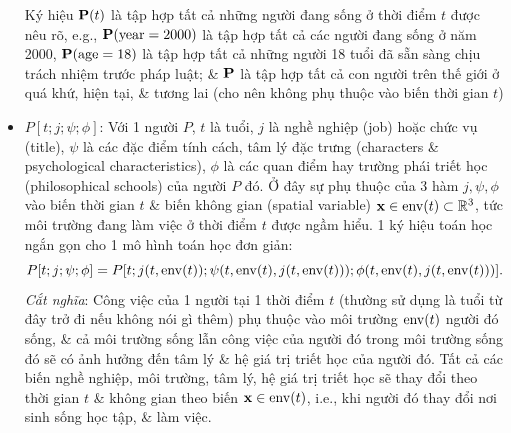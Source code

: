 \documentclass[12pt,twoside]{book}
\begin{document}
\begin{itemize}
	Ký hiệu ${\bf P}(t)$ là tập hợp tất cả những người đang sống ở thời điểm $t$ được nêu rõ, e.g., ${\bf P}({\rm year} = 2000)$ là tập hợp tất cả các người đang sống ở năm 2000, ${\bf P}({\rm age} = 18)$ là tập hợp tất cả những người 18 tuổi đã sẵn sàng chịu trách nhiệm trước pháp luật; \& ${\bf P}$ là tập hợp tất cả con người trên thế giới ở quá khứ, hiện tại, \& tương lai (cho nên không phụ thuộc vào biến thời gian $t$)
	\item $P[t;j;\psi;\phi]$: Với 1 người $P$, $t$ là tuổi, $j$ là nghề nghiệp (job) hoặc chức vụ (title), $\psi$ là các đặc điểm tính cách, tâm lý đặc trưng (characters \& psychological characteristics), $\phi$ là các quan điểm hay trường phái triết học (philosophical schools) của người $P$ đó. Ở đây sự phụ thuộc của 3 hàm $j,\psi,\phi$ vào biến thời gian $t$ \& biến không gian (spatial variable) ${\bf x}\in{\rm env}(t)\subset\mathbb{R}^3$, tức môi trường đang làm việc ở thời điểm $t$ được ngầm hiểu. 1 ký hiệu toán học ngắn gọn cho 1 mô hình toán học đơn giản:
	\begin{equation}
		P[t;j;\psi;\phi] = P[t;j(t,{\rm env}(t));\psi(t,{\rm env}(t),j(t,{\rm env}(t)));\phi(t,{\rm env}(t),j(t,{\rm env}(t)))].
	\end{equation}
	{\it Cắt nghĩa}: Công việc của 1 người tại 1 thời điểm $t$ (thường sử dụng là tuổi từ đây trở đi nếu không nói gì thêm) phụ thuộc vào môi trường ${\rm env}(t)$ người đó sống, \& cả môi trường sống lẫn công việc của người đó trong môi trường sống đó sẽ có ảnh hưởng đến tâm lý \& hệ giá trị triết học của người đó. Tất cả các biến nghề nghiệp, môi trường, tâm lý, hệ giá trị triết học sẽ thay đổi theo thời gian $t$ \& không gian theo biến ${\bf x}\in{\rm env}(t)$, i.e., khi người đó thay đổi nơi sinh sống học tập, \& làm việc.
	

\end{itemize}
\end{document}
